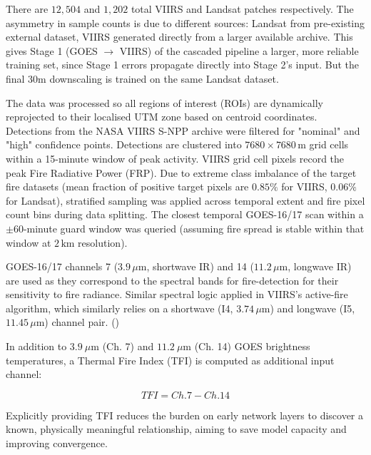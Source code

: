 \documentclass[a4paper, 11pt]{article} %
\begin{document}
There are $12,504$ and $1,202$ total VIIRS and Landsat patches respectively. The asymmetry in sample counts is due to different sources: Landsat from pre-existing external dataset, VIIRS generated directly from a larger available archive. This gives Stage 1 (GOES $\to$ VIIRS) of the cascaded pipeline a larger, more reliable training set, since Stage 1 errors propagate directly into Stage 2's input. But the final 30m downscaling is trained on the same Landsat dataset.

The data was processed so all regions of interest (ROIs) are dynamically reprojected to their localised UTM zone based on centroid coordinates. Detections from the NASA VIIRS S-NPP archive were filtered for "nominal" and "high" confidence points. Detections are clustered into $7680 \times 7680\,\text{m}$ grid cells within a 15-minute window of peak activity. VIIRS grid cell pixels record the peak Fire Radiative Power (FRP). Due to extreme class imbalance of the target fire datasets (mean fraction of positive target pixels are $0.85\%$ for VIIRS, $0.06\%$ for Landsat), stratified sampling was applied across temporal extent and fire pixel count bins during data splitting. The closest temporal GOES-16/17 scan within a $\pm 60$-minute guard window was queried (assuming fire spread is stable within that window at $2\,\text{km}$ resolution).

GOES-16/17 channels 7 ($3.9\,\mu\text{m}$, shortwave IR) and 14 ($11.2\,\mu\text{m}$, longwave IR) are used as they correspond to the spectral bands for fire-detection for their sensitivity to fire radiance. Similar spectral logic applied in VIIRS's active-fire algorithm, which similarly relies on a shortwave (I4, $3.74\,\mu\text{m}$) and longwave (I5, $11.45\,\mu\text{m}$) channel pair. (\cite{schmidtGOESRAdvancedBaseline})

In addition to $3.9\ \mu\text{m}$ (Ch. 7) and $11.2\ \mu\text{m}$ (Ch. 14) GOES brightness temperatures, a Thermal Fire Index (TFI) is computed as additional input channel:

\begin{equation}
    TFI = Ch.7 - Ch.14
    \label{eq:tfi}
\end{equation}

Explicitly providing TFI reduces the burden on early network layers to discover a known, physically meaningful relationship, aiming to save model capacity and improving convergence.
\end{document}
